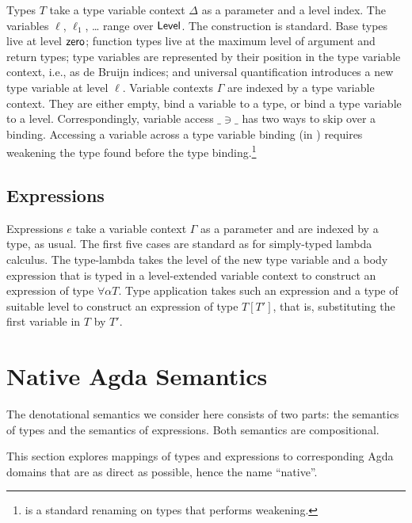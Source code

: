 \documentclass[manuscript,screen,review,anonymous]{acmart}
\begin{document}
Types $T$ take a type variable context $\Delta$ as a parameter and a level
index. The variables $\ell$, $\ell_1$, \dots{} range over
$\ALevel$. The construction is standard. Base types live at level
$\ASetzero$; function types live at the maximum level of argument and
return types; type variables are
represented by their position in the type variable context, i.e.,
as de Bruijn indices; and
universal quantification introduces a new type variable at level $\ell$.
\SFType
Variable contexts $\Gamma$ are indexed by a type variable context. They
are either empty, bind a variable to a type, or bind a type variable
to a level. Correspondingly, variable access $\_\ni\_$ has two ways to
skip over a binding. Accessing a variable across a type variable
binding (in \Atskip) requires weakening the type found before the type
binding.\footnote{{\ATwk} is a standard renaming on types that
  performs weakening.}

\begin{minipage}{0.45\linewidth}
  \SFEEnv
\end{minipage}
\begin{minipage}{0.45\linewidth}
  \SFEEnvNi
\end{minipage}

\subsection{Expressions}
\label{sec:syntax-expressions}


Expressions $e$ take a variable context $\Gamma$ as a parameter and are indexed
by a type, as usual. The first five cases are standard as for
simply-typed lambda calculus. The type-lambda takes the level of the
new type variable and a body expression that is typed in a
level-extended variable context to construct an expression of type
$\forall\alpha T$. Type application takes such an expression and a
type of suitable level to construct an expression of type $T[T']$,
that is, substituting the first variable in $T$ by $T'$.

\SFExpr

\section{Native Agda Semantics}
\label{sec:semantics}

The denotational semantics we consider here consists of two parts: the semantics of
types and the semantics of expressions. Both semantics are
compositional.

This section explores mappings of types and expressions to
corresponding Agda domains that are as direct as possible, hence the
name ``native''.
\end{document}
